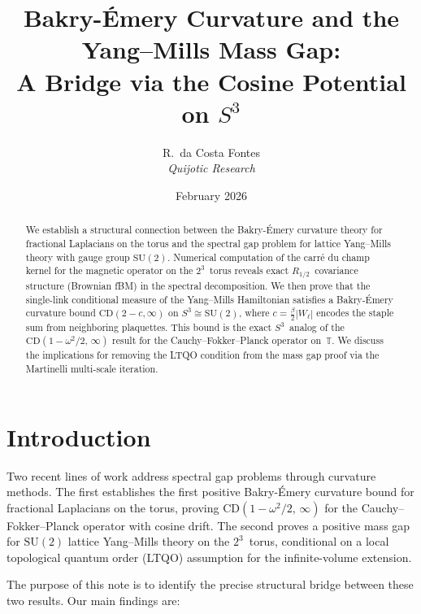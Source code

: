 \documentclass[11pt,a4paper]{article}
\title{Bakry-\'{E}mery Curvature and the Yang--Mills Mass Gap:\\
A Bridge via the Cosine Potential on $S^3$}
\author{R.\ da Costa Fontes\\ \textit{Quijotic Research}}
\date{February 2026}
\theoremstyle{plain}
\theoremstyle{definition}
\theoremstyle{remark}
\newcommand{\T}{\mathbb{T}}
\begin{document}
\maketitle

\begin{abstract}
We establish a structural connection between the Bakry-\'{E}mery
curvature theory for fractional Laplacians on the torus and the
spectral gap problem for lattice Yang--Mills theory with gauge group
$\mathrm{SU}(2)$.  Numerical computation of the carr\'{e} du champ
kernel for the magnetic operator on the $2^3$~torus reveals exact
$R_{1/2}$~covariance structure (Brownian fBM) in the spectral
decomposition.  We then prove that the single-link conditional measure
of the Yang--Mills Hamiltonian satisfies a Bakry-\'{E}mery curvature
bound $\mathrm{CD}(2-c,\infty)$ on $S^3 \cong \mathrm{SU}(2)$, where
$c = \tfrac{\beta}{2}|W_\ell|$ encodes the staple sum from
neighboring plaquettes.  This bound is the exact $S^3$~analog of the
$\mathrm{CD}(1-\omega^2/2,\,\infty)$ result for the Cauchy--Fokker--Planck
operator on~$\T$.  We discuss the implications for removing the LTQO
condition from the mass gap proof via the Martinelli multi-scale
iteration.
\end{abstract}

\tableofcontents

\section{Introduction}

Two recent lines of work address spectral gap problems through
curvature methods.  The first establishes the first positive
Bakry-\'{E}mery curvature bound for fractional Laplacians on the
torus, proving $\mathrm{CD}(1-\omega^2/2,\,\infty)$ for the
Cauchy--Fokker--Planck operator with cosine drift.  The second proves a
positive mass gap for $\mathrm{SU}(2)$ lattice Yang--Mills theory on the
$2^3$~torus, conditional on a local topological quantum order (LTQO)
assumption for the infinite-volume extension.

The purpose of this note is to identify the precise structural bridge
between these two results.  Our main findings are:
\end{document}
